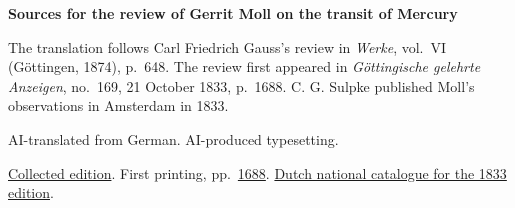 \clearpage\thispagestyle{empty}
\begin{center}\Large\bfseries Sources for the review of Gerrit Moll on the transit of Mercury\end{center}

The translation follows Carl Friedrich Gauss’s review in \emph{Werke}, vol.~VI (Göttingen, 1874), p.~648. The review first appeared in \emph{Göttingische gelehrte Anzeigen}, no.~169, 21 October 1833, p.~1688. C. G. Sulpke published Moll’s observations in Amsterdam in 1833.

AI-translated from German. AI-produced typesetting.

\href{https://gdz.sub.uni-goettingen.de/id/PPN236007467}{Collected edition}. First printing, pp.~\href{https://images.p.sub.uni-goettingen.de/iiif/image/gdz:PPN385030444_1833_2:00000650/full/1800,/0/default.jpg}{1688}. \href{https://webggc.oclc.org/cbs/DB=2.37/PPNSET?PPN=065382919}{Dutch national catalogue for the 1833 edition}.

\clearpage
